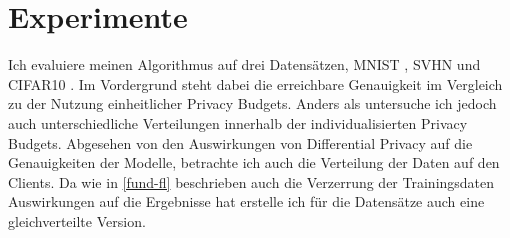 \chapter{Experimente}\label{chap:experiments}

Ich evaluiere meinen Algorithmus auf drei Datensätzen, MNIST \cite{lecun:1998}, SVHN \cite{netzer:2011} und CIFAR10 \cite{krizhevsky:2009}. Im Vordergrund steht dabei die erreichbare Genauigkeit im Vergleich zu der Nutzung einheitlicher Privacy Budgets. Anders als \textcite{aldaghri:2023} untersuche ich jedoch auch unterschiedliche Verteilungen innerhalb der individualisierten Privacy Budgets. Abgesehen von den Auswirkungen von Differential Privacy auf die Genauigkeiten der Modelle, betrachte ich auch die Verteilung der Daten auf den Clients. Da wie in \autoref{fund-fl} beschrieben auch die Verzerrung der Trainingsdaten Auswirkungen auf die Ergebnisse hat erstelle ich für die Datensätze auch eine gleichverteilte Version.

